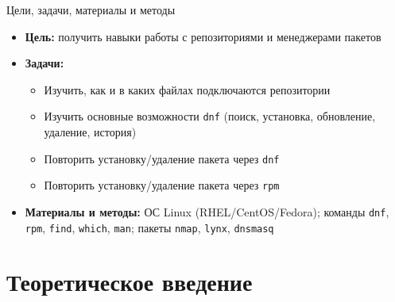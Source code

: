 \documentclass[
  ignorenonframetext,
  aspectratio=169,
  russian,
]{beamer}
\providecommand{\tightlist}{%
  \setlength{\itemsep}{0pt}\setlength{\parskip}{0pt}}
\begin{document}
\begin{frame}[fragile]{Цели, задачи, материалы и методы}
\protect{}\label{ux446ux435ux43bux438-ux437ux430ux434ux430ux447ux438-ux43cux430ux442ux435ux440ux438ux430ux43bux44b-ux438-ux43cux435ux442ux43eux434ux44b}
\begin{itemize}[<+->]
\tightlist
\item
  \textbf{Цель:} получить навыки работы с репозиториями и менеджерами
  пакетов
\item
  \textbf{Задачи:}

  \begin{itemize}[<+->]
  \tightlist
  \item
    Изучить, как и в каких файлах подключаются репозитории
  \item
    Изучить основные возможности \texttt{dnf} (поиск, установка,
    обновление, удаление, история)
  \item
    Повторить установку/удаление пакета через \texttt{dnf}
  \item
    Повторить установку/удаление пакета через \texttt{rpm}
  \end{itemize}
\item
  \textbf{Материалы и методы:} ОС Linux (RHEL/CentOS/Fedora); команды
  \texttt{dnf}, \texttt{rpm}, \texttt{find}, \texttt{which},
  \texttt{man}; пакеты \texttt{nmap}, \texttt{lynx}, \texttt{dnsmasq}
\end{itemize}
\end{frame}

\section{Теоретическое
введение}\label{ux442ux435ux43eux440ux435ux442ux438ux447ux435ux441ux43aux43eux435-ux432ux432ux435ux434ux435ux43dux438ux435}
\end{document}
